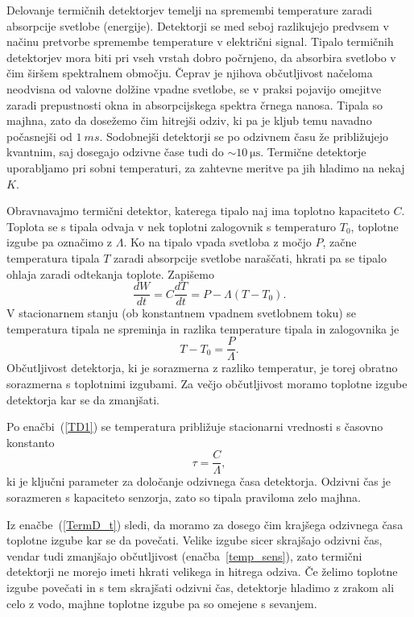 Delovanje termičnih detektorjev temelji na spremembi temperature zaradi absorpcije svetlobe 
(energije). Detektorji se med seboj razlikujejo predvsem v načinu pretvorbe spremembe 
temperature v električni signal.
Tipalo termičnih detektorjev mora biti pri vseh vrstah dobro počrnjeno, da absorbira
svetlobo v čim širšem spektralnem območju. Čeprav je njihova občutljivost načeloma 
neodvisna od valovne dolžine vpadne svetlobe, se v praksi pojavijo omejitve zaradi
prepustnosti okna in absorpcijskega spektra črnega nanosa. Tipala so majhna, zato 
da dosežemo čim hitrejši odziv, ki pa je kljub temu navadno počasnejši od $1~\si{ms}$. 
Sodobnejši detektorji se po odzivnem času že približujejo 
kvantnim, saj dosegajo odzivne čase tudi do $\sim 10~\si{\micro\second}$. 
Termične detektorje uporabljamo pri sobni temperaturi,  
za zahtevne meritve pa jih hladimo na nekaj $\si{K}$. 

Obravnavajmo termični detektor, katerega tipalo naj ima toplotno kapaciteto $C$. Toplota
se s tipala odvaja v nek toplotni zalogovnik s temperaturo $T_0$, 
toplotne izgube pa označimo z $\Lambda$. Ko na tipalo vpada svetloba z močjo $P$, 
začne temperatura tipala $T$ zaradi absorpcije svetlobe naraščati, hkrati pa se tipalo 
ohlaja zaradi odtekanja toplote. Zapišemo
\begin{equation}
\frac{dW}{dt} = C \frac{dT}{dt} = P - \Lambda (T-T_0).
\label{TD1}
\end{equation}
V stacionarnem stanju (ob konstantnem vpadnem svetlobnem toku) se
temperatura tipala ne spreminja in razlika temperature tipala in zalogovnika je 
\begin{equation}
T - T_0 = \frac{P}{\Lambda}.
\label{temp_sens}
\end{equation}
Občutljivost detektorja, ki je sorazmerna z razliko temperatur, 
je torej obratno sorazmerna s toplotnimi izgubami. Za večjo občutljivost moramo
toplotne izgube detektorja kar se da zmanjšati. 

Po enačbi~(\ref{TD1}) se temperatura približuje stacionarni vrednosti s časovno konstanto 
\begin{equation}
\tau = \frac{C}{\Lambda},
\label{TermD_t}
\end{equation}
ki je ključni parameter za določanje odzivnega časa detektorja. Odzivni
čas je sorazmeren s kapaciteto senzorja, zato so tipala praviloma 
zelo majhna.

Iz enačbe~(\ref{TermD_t}) sledi, da moramo za dosego čim krajšega odzivnega časa toplotne izgube 
kar se da povečati. Velike izgube sicer skrajšajo odzivni čas, 
vendar tudi zmanjšajo občutljivost (enačba~\ref{temp_sens}), 
zato termični detektorji ne morejo imeti hkrati velikega in hitrega odziva. 
Če želimo toplotne izgube povečati in s tem skrajšati odzivni čas, detektorje hladimo z zrakom 
ali celo z vodo, majhne toplotne izgube pa so omejene s sevanjem.  

